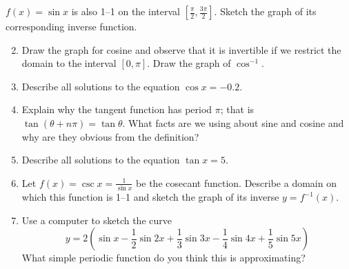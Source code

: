 \goodbreak


\begin{exercises}
	\exstart $f(x)=\sin x$ is also 1--1 on the interval $[\frac\pi 2,\frac{3\pi}2]$. Sketch the graph of its corresponding inverse function.
	
	\begin{enumerate}\setcounter{enumi}{1}
	  \item Draw the graph for cosine and observe that it is invertible if we restrict the domain to the interval $[0,\pi]$. Draw the graph of $\cos^{-1}$.
	  
	  \item Describe all solutions to the equation $\cos x=-0.2$.
	  
	  \item Explain why the tangent function has period $\pi$; that is $\tan(\theta+n\pi)=\tan \theta$. What facts are we using about sine and cosine and why are they obvious from the definition?
	  
	  \item Describe all solutions to the equation $\tan x=5$.
	  
	  \item Let $f(x)=\csc x=\frac 1{\sin x}$ be the cosecant function. Describe a domain on which this function is 1--1 and sketch the graph of its inverse $y=f^{-1}(x)$.
	  
	  \item Use a computer to sketch the curve
	  \[
	  	y=2\left(\sin x-\frac 12\sin 2x+\frac 13\sin 3x-\frac 14\sin 4x+\frac 15\sin 5x\right)
	  \]
	  What simple periodic function do you think this is approximating?
	\end{enumerate}
\end{exercises}

\clearpage

